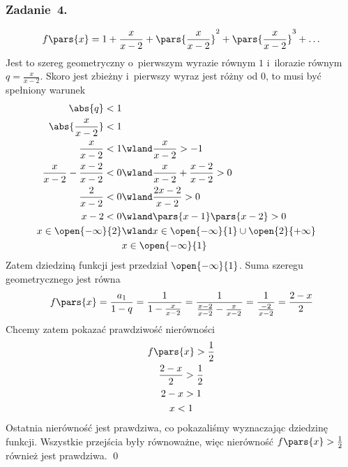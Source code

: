 \subsubsection*{Zadanie~4.}
\begin{equation*}
    f\pars{x} = 1 + \frac{x}{x - 2} + \pars{\frac{x}{x - 2}}^2 + \pars{\frac{x}{x - 2}}^3 + \ldots
\end{equation*}
Jest to szereg geometryczny o~pierwszym wyrazie równym \(1\) i~ilorazie równym \(q = \frac{x}{x - 2}\). Skoro jest zbieżny i~pierwszy wyraz jest różny od \(0\), to musi być spełniony warunek
\begin{align*}
    \abs{q} < 1\\
    \abs{\frac{x}{x - 2}} < 1\\
    \frac{x}{x - 2} < 1 &\wland \frac{x}{x - 2} > -1\\
    \frac{x}{x - 2} - \frac{x - 2}{x - 2} < 0 &\wland \frac{x}{x - 2} + \frac{x - 2}{x - 2} > 0\\
    \frac{2}{x - 2} < 0 &\wland \frac{2x - 2}{x - 2} > 0\\
    x - 2 < 0 &\wland \pars{x - 1}\pars{x - 2} > 0\\
    x \in \open{-\infty}{2} &\wland x \in \open{-\infty}{1} \cup \open{2}{+\infty}\\
    & x \in \open{-\infty}{1}
\end{align*}
Zatem dziedziną funkcji jest przedział \(\open{-\infty}{1}\). Suma szeregu geometrycznego jest równa
\begin{equation*}
    f\pars{x}
        = \frac{a_1}{1 - q}
        = \frac{1}{1 - \frac{x}{x - 2}}
        = \frac{1}{\frac{x - 2}{x - 2} - \frac{x}{x - 2}}
        = \frac{1}{\frac{-2}{x - 2}}
        = \frac{2 - x}{2}
\end{equation*}
Chcemy zatem pokazać prawdziwość nierówności
\begin{gather*}
    f\pars{x} > \frac{1}{2}\\
    \frac{2 - x}{2} > \frac{1}{2}\\
    2 - x > 1\\
    x < 1
\end{gather*}
Ostatnia nierówność jest prawdziwa, co pokazaliśmy wyznaczając dziedzinę funkcji. Wszystkie przejścia były równoważne, więc nierówność \(f\pars{x} > \frac{1}{2}\) również jest prawdziwa.
\qed
